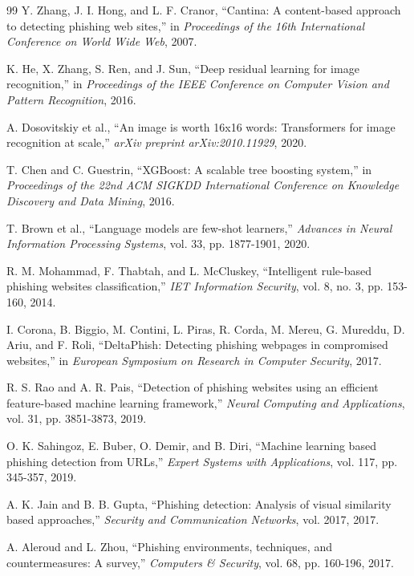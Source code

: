 \documentclass[12pt,a4paper]{report}
\begin{document}
\begin{thebibliography}{99}
Y. Zhang, J. I. Hong, and L. F. Cranor, ``Cantina: A content-based approach to detecting phishing web sites,'' in \textit{Proceedings of the 16th International Conference on World Wide Web}, 2007.

K. He, X. Zhang, S. Ren, and J. Sun, ``Deep residual learning for image recognition,'' in \textit{Proceedings of the IEEE Conference on Computer Vision and Pattern Recognition}, 2016.

A. Dosovitskiy et al., ``An image is worth 16x16 words: Transformers for image recognition at scale,'' \textit{arXiv preprint arXiv:2010.11929}, 2020.

T. Chen and C. Guestrin, ``XGBoost: A scalable tree boosting system,'' in \textit{Proceedings of the 22nd ACM SIGKDD International Conference on Knowledge Discovery and Data Mining}, 2016.

T. Brown et al., ``Language models are few-shot learners,'' \textit{Advances in Neural Information Processing Systems}, vol. 33, pp. 1877-1901, 2020.

R. M. Mohammad, F. Thabtah, and L. McCluskey, ``Intelligent rule-based phishing websites classification,'' \textit{IET Information Security}, vol. 8, no. 3, pp. 153-160, 2014.

I. Corona, B. Biggio, M. Contini, L. Piras, R. Corda, M. Mereu, G. Mureddu, D. Ariu, and F. Roli, ``DeltaPhish: Detecting phishing webpages in compromised websites,'' in \textit{European Symposium on Research in Computer Security}, 2017.

R. S. Rao and A. R. Pais, ``Detection of phishing websites using an efficient feature-based machine learning framework,'' \textit{Neural Computing and Applications}, vol. 31, pp. 3851-3873, 2019.

O. K. Sahingoz, E. Buber, O. Demir, and B. Diri, ``Machine learning based phishing detection from URLs,'' \textit{Expert Systems with Applications}, vol. 117, pp. 345-357, 2019.

A. K. Jain and B. B. Gupta, ``Phishing detection: Analysis of visual similarity based approaches,'' \textit{Security and Communication Networks}, vol. 2017, 2017.

A. Aleroud and L. Zhou, ``Phishing environments, techniques, and countermeasures: A survey,'' \textit{Computers \& Security}, vol. 68, pp. 160-196, 2017.

\end{thebibliography}
\end{document}
